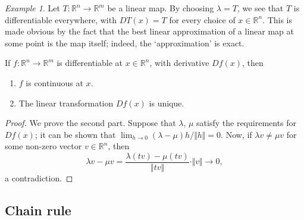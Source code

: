 \documentclass[11pt]{article}
\newcommand{\R}{\mathbb{R}}
\newcommand{\norm}[1]{\Vert #1 \Vert}
\theoremstyle{definition}
\theoremstyle{remark}
\newtheorem*{example}{Example}
\numberwithin{equation}{section}
\begin{document}
    \begin{example}
        Let $T\colon \R^n \to \R^m$ be a linear map. By choosing $\lambda = T$, we
        see that $T$ is differentiable everywhere, with $DT(x) = T$ for every choice
        of $x \in \R^n$. This is made obvious by the fact that the best linear
        approximation of a linear map at some point is the map itself; indeed, the
        `approximation' is exact.
    \end{example}

    \begin{lemma}
        If $f\colon \R^n \to \R^m$ is differentiable at $x \in \R^n$, with derivative
        $Df(x)$, then
        \begin{enumerate}
            \itemsep0em
            \item $f$ is continuous at $x$.
            \item The linear transformation $Df(x)$ is unique.
        \end{enumerate}
    \end{lemma}
    \begin{proof}
        We prove the second part. Suppose that $\lambda$, $\mu$ satisfy the
        requirements for $Df(x)$; it can be shown that $\lim_{h \to 0} (\lambda -
        \mu)h / \norm{h} = 0$. Now, if $\lambda v \neq \mu v$ for some non-zero
        vector $v \in \R^n$, then \[
            \lambda v - \mu v = \frac{\lambda(tv) - \mu(tv)}{\norm{tv}} \cdot
            \norm{v} \to 0,
        \] a contradiction.
    \end{proof}

    \subsection{Chain rule}
\end{document}

